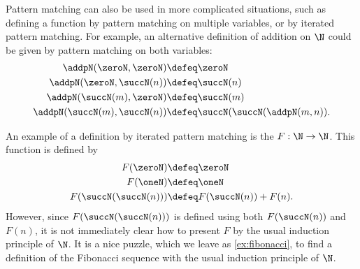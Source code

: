 Pattern matching can also be used in more complicated situations, such as defining a function by pattern matching on multiple variables, or by iterated pattern matching. For example, an alternative definition of addition on $\N$ could be given by pattern matching on both variables:
\begin{align*}
  \addpN(\zeroN,\zeroN) & \defeq \zeroN \\*
  \addpN(\zeroN,\succN(n)) & \defeq \succN(n) \\*
  \addpN(\succN(m),\zeroN) & \defeq \succN(m) \\*
  \addpN(\succN(m),\succN(n)) & \defeq \succN(\succN(\addpN(m,n)).
\end{align*}

An example of a definition by iterated pattern matching is the  $F:\N\to\N$. This function is defined by
\begin{align*}
  F(\zeroN) & \defeq \zeroN \\
  F(\oneN) & \defeq \oneN \\
  F(\succN(\succN(n))) & \defeq F(\succN(n))+F(n).
\end{align*}
However, since $F(\succN(\succN(n)))$ is defined using both $F(\succN(n))$ and $F(n)$, it is not immediately clear how to present $F$ by the usual induction principle of $\N$. It is a nice puzzle, which we leave as \cref{ex:fibonacci}, to find a definition of the Fibonacci sequence with the usual induction principle of $\N$. 

